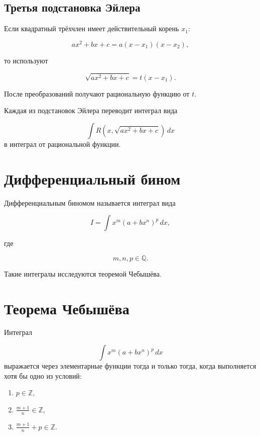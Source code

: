 \documentclass[14pt]{extreport}
\begin{document}
\subsection{Третья подстановка Эйлера}

Если квадратный трёхчлен имеет действительный корень $x_1$:

\[
ax^2+bx+c=a(x-x_1)(x-x_2),
\]

то используют

\[
\sqrt{ax^2+bx+c}
=
t(x-x_1).
\]

После преобразований получают рациональную функцию от $t$.

\begin{theorem}
Каждая из подстановок Эйлера переводит интеграл вида

\[
\int R(x,\sqrt{ax^2+bx+c})\,dx
\]
в интеграл от рациональной функции.
\end{theorem}

\section{Дифференциальный бином}

\begin{definition}
Дифференциальным биномом называется интеграл вида

\[
I=
\int x^m(a+bx^n)^p\,dx,
\]

где

\[
m,n,p\in\mathbb Q.
\]

\end{definition}

Такие интегралы исследуются теоремой Чебышёва.

\section{Теорема Чебышёва}

\begin{theorem}
Интеграл

\[
\int x^m(a+bx^n)^p\,dx
\]
выражается через элементарные функции тогда и только тогда,
когда выполняется хотя бы одно из условий:

\begin{enumerate}
    \item $p\in\mathbb Z,$
    \item $\frac{m+1}{n}\in\mathbb Z,$
    \item $\frac{m+1}{n}+p\in\mathbb Z.$
\end{enumerate}

\end{theorem}
\end{document}
